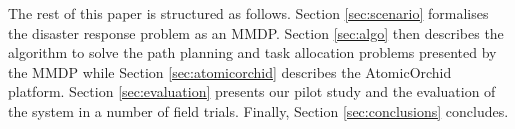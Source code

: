 The rest of this paper is structured as follows. Section \ref{sec:scenario} formalises the disaster response problem as an MMDP. Section \ref{sec:algo} then describes the algorithm to solve the path planning and task allocation problems presented by the MMDP while Section \ref{sec:atomicorchid} describes the AtomicOrchid platform. Section \ref{sec:evaluation} presents our pilot study and the evaluation of the system in a number of field trials.  Finally, Section \ref{sec:conclusions} concludes.